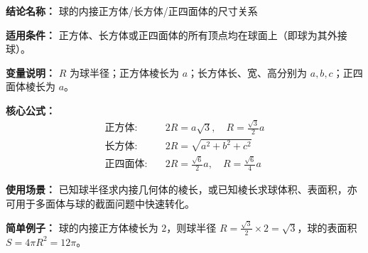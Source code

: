 \textbf{结论名称：} 球的内接正方体/长方体/正四面体的尺寸关系

\textbf{适用条件：} 正方体、长方体或正四面体的所有顶点均在球面上（即球为其外接球）。

\textbf{变量说明：} \(R\) 为球半径；正方体棱长为 \(a\)；长方体长、宽、高分别为 \(a,b,c\)；正四面体棱长为 \(a\)。

\textbf{核心公式：}
\[
\boxed{
\begin{aligned}
\text{正方体:}&\quad 2R = a\sqrt{3},\quad R = \frac{\sqrt{3}}{2}a \\[4pt]
\text{长方体:}&\quad 2R = \sqrt{a^2+b^2+c^2} \\[4pt]
\text{正四面体:}&\quad 2R = \frac{\sqrt{6}}{2}a,\quad R = \frac{\sqrt{6}}{4}a
\end{aligned}
}
\]

\textbf{使用场景：} 已知球半径求内接几何体的棱长，或已知棱长求球体积、表面积，亦可用于多面体与球的截面问题中快速转化。

\textbf{简单例子：} 球的内接正方体棱长为 \(2\)，则球半径 \(R = \frac{\sqrt{3}}{2}\times 2 = \sqrt{3}\)，球的表面积 \(S = 4\pi R^2 = 12\pi\)。